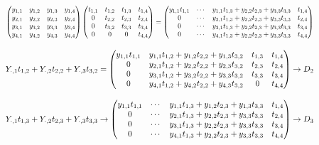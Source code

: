 \documentclass[]{article}
\begin{document}
\begin{equation}
\resizebox{.9\hsize}{!}{$
	\begin{pmatrix}
	y_{1,1} & y_{1,2} & y_{1,3}  & y_{1,4} \\
	y_{2,1} & y_{2,2} & y_{2,3}  & y_{2,4} \\
	y_{3,1} & y_{3,2} & y_{3,3}  & y_{3,4} \\
	y_{4,1} & y_{4,2} & y_{4,3}  & y_{4,4} \\
	\end{pmatrix}
	\begin{pmatrix}
	t_{1,1} & t_{1,2} & t_{1,3}  & t_{1,4} \\
	0 & t_{2,2} & t_{2,3}  & t_{2,4} \\
	0 & t_{3,2} & t_{3,3}  & t_{3,4} \\
	0 & 0 & 0  & t_{4,4} \\
	\end{pmatrix}
	=
	\begin{pmatrix}
	y_{1,1}t_{1,1} & \cdots &y_{1,1}t_{1,3}+ y_{2,2}t_{2,3} + y_{3,3}t_{3,3} & t_{1,4} \\
	0 & \cdots  & y_{2,1}t_{1,3}+ y_{2,2}t_{2,3} + y_{3,3}t_{3,3}  & t_{2,4} \\
	0 & \cdots  & y_{3,1}t_{1,3}+ y_{2,2}t_{2,3} + y_{3,3}t_{3,3}  & t_{3,4} \\
	0 & \cdots  & y_{4,1}t_{1,3}+ y_{2,2}t_{2,3} + y_{3,3}t_{3,3}  & t_{4,4} \\
	\end{pmatrix}
	$}
\end{equation}



\begin{equation}
\resizebox{.9\hsize}{!}{$
	Y_{\cdot,1}t_{1,2}+	Y_{\cdot,2}t_{2,2}+	Y_{\cdot,3}t_{3,2}
	=
	\begin{pmatrix}
	y_{1,1}t_{1,1} & y_{1,1}t_{1,2}+ y_{1,2}t_{2,2} + y_{1,3}t_{3,2}& t_{1,3}  & t_{1,4} \\
	0 & y_{2,1}t_{1,2}+ y_{2,2}t_{2,2} + y_{2,3}t_{3,2} & t_{2,3}  & t_{2,4} \\
	0 & y_{3,1}t_{1,2}+ y_{3,2}t_{2,2} + y_{3,3}t_{3,2} & t_{3,3}  & t_{3,4} \\
	0 & y_{4,1}t_{1,2}+ y_{4,2}t_{2,2} + y_{4,3}t_{3,2} & 0  & t_{4,4} \\
	\end{pmatrix}
	\rightarrow D_{2}
	$}
\end{equation}

\begin{equation}
\resizebox{.9\hsize}{!}{$
	Y_{\cdot,1}t_{1,3}+	Y_{\cdot,2}t_{2,3}+	Y_{\cdot,3}t_{3,3}
	\rightarrow
	\begin{pmatrix}
	y_{1,1}t_{1,1} & \cdots &y_{1,1}t_{1,3}+ y_{1,2}t_{2,3} + y_{1,3}t_{3,3} & t_{1,4} \\
	0 & \cdots  & y_{2,1}t_{1,3}+ y_{2,2}t_{2,3} + y_{3,3}t_{3,3}  & t_{2,4} \\
	0 & \cdots  & y_{3,1}t_{1,3}+ y_{2,2}t_{2,3} + y_{3,3}t_{3,3}  & t_{3,4} \\
	0 & \cdots  & y_{4,1}t_{1,3}+ y_{2,2}t_{2,3} + y_{3,3}t_{3,3}  & t_{4,4} \\
	\end{pmatrix}
	\rightarrow D_{3}
	$}
\end{equation}
\end{document}
